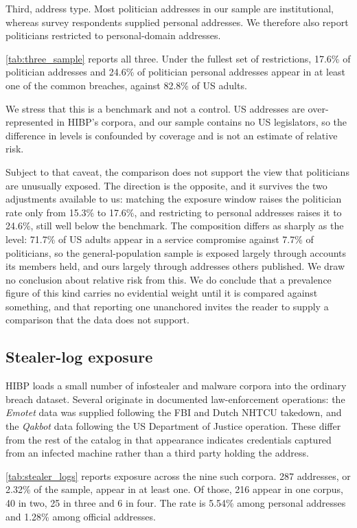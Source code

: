 \documentclass[12pt, letterpaper]{article}
\begin{document}
Third, address type. Most politician addresses in our sample are institutional, whereas survey respondents supplied personal addresses. We therefore also report politicians restricted to personal-domain addresses.

\cref{tab:three_sample} reports all three. Under the fullest set of restrictions, 17.6\% of politician addresses and 24.6\% of politician personal addresses appear in at least one of the common breaches, against 82.8\% of US adults.

We stress that this is a benchmark and not a control. US addresses are over-represented in HIBP's corpora, and our sample contains no US legislators, so the difference in levels is confounded by coverage and is not an estimate of relative risk.

Subject to that caveat, the comparison does not support the view that politicians are unusually exposed. The direction is the opposite, and it survives the two adjustments available to us: matching the exposure window raises the politician rate only from 15.3\% to 17.6\%, and restricting to personal addresses raises it to 24.6\%, still well below the benchmark. The composition differs as sharply as the level: 71.7\% of US adults appear in a service compromise against 7.7\% of politicians, so the general-population sample is exposed largely through accounts its members held, and ours largely through addresses others published. We draw no conclusion about relative risk from this. We do conclude that a prevalence figure of this kind carries no evidential weight until it is compared against something, and that reporting one unanchored invites the reader to supply a comparison that the data does not support.



\subsection*{Stealer-log exposure}

HIBP loads a small number of infostealer and malware corpora into the ordinary breach dataset. Several originate in documented law-enforcement operations: the \textit{Emotet} data was supplied following the FBI and Dutch NHTCU takedown, and the \textit{Qakbot} data following the US Department of Justice operation. These differ from the rest of the catalog in that appearance indicates credentials captured from an infected machine rather than a third party holding the address.

\cref{tab:stealer_logs} reports exposure across the nine such corpora. 287 addresses, or 2.32\% of the sample, appear in at least one. Of those, 216 appear in one corpus, 40 in two, 25 in three and 6 in four. The rate is 5.54\% among personal addresses and 1.28\% among official addresses.
\end{document}
